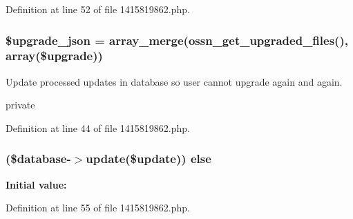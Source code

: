 Definition at line 52 of file 1415819862.\+php.

\subsubsection[{\texorpdfstring{\$upgrade\+\_\+json}{$upgrade_json}}]{\setlength{\rightskip}{0pt plus 5cm}\$upgrade\+\_\+json = array\+\_\+merge({\bf ossn\+\_\+get\+\_\+upgraded\+\_\+files}(), array(\$upgrade))}\hypertarget{1415819862_8php_a512525d0f5eb608ac72ca7b85e5fbf65}{}\label{1415819862_8php_a512525d0f5eb608ac72ca7b85e5fbf65}
Update processed updates in database so user cannot upgrade again and again.

private 

Definition at line 44 of file 1415819862.\+php.

\subsubsection[{\texorpdfstring{else}{else}}]{ (\${\bf database}-\/$>${\bf update}(\${\bf update})) else}\hypertarget{1415819862_8php_aa7c58ee9f19ec0c0f3a1951839273e79}{}\label{1415819862_8php_aa7c58ee9f19ec0c0f3a1951839273e79}
{\bfseries Initial value\+:}


Definition at line 55 of file 1415819862.\+php.

